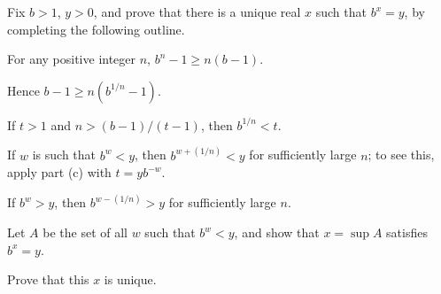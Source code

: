 \documentclass{assignment}
\begin{document}
\begin{question}[7]
  Fix $b > 1$, $y > 0$, and prove that there is a unique real $x$ such that $b^x = y$, by completing
  the following outline.
  \begin{qparts}
    \item For any positive integer $n$, $b^n - 1 \geq n(b-1)$.
    \item Hence $b - 1 \geq n(b^{1/n} - 1)$. 
    \item If $t > 1$ and $n > (b-1)/(t-1)$, then $b^{1/n} < t$.
    \item If $w$ is such that $b^w < y$, then $b^{w + (1/n)} < y$ for sufficiently large $n$; to see this,
      apply part (c) with $t = yb^{-w}$. 
    \item If $b^w > y$, then $b^{w - (1/n)} > y$ for sufficiently large $n$.
    \item Let $A$ be the set of all $w$ such that $b^w < y$, and show that $x = \sup A$ satisfies $b^x 
      = y$. 
    \item Prove that this $x$ is unique.
  \end{qparts}
\end{question}
\end{document}
